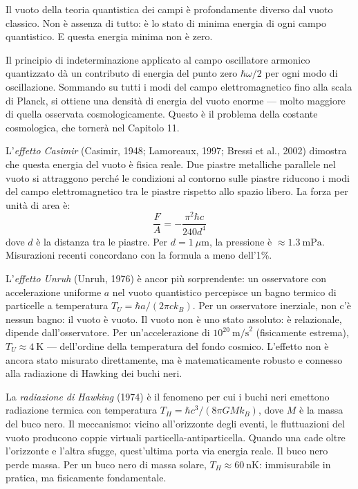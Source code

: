 \documentclass[11.5pt,a4paper,openany]{book}
\theoremstyle{remark}
\begin{document}
Il vuoto della teoria quantistica dei campi è profondamente diverso dal vuoto classico. Non è assenza di tutto: è lo stato di minima energia di ogni campo quantistico. E questa energia minima non è zero.

Il principio di indeterminazione applicato al campo oscillatore armonico quantizzato dà un contributo di energia del punto zero $\hbar\omega/2$ per ogni modo di oscillazione. Sommando su tutti i modi del campo elettromagnetico fino alla scala di Planck, si ottiene una densità di energia del vuoto enorme --- molto maggiore di quella osservata cosmologicamente. Questo è il problema della costante cosmologica, che tornerà nel Capitolo 11.

L'\textit{effetto Casimir} (Casimir, 1948; Lamoreaux, 1997; Bressi et al., 2002) dimostra che questa energia del vuoto è fisica reale. Due piastre metalliche parallele nel vuoto si attraggono perché le condizioni al contorno sulle piastre riducono i modi del campo elettromagnetico tra le piastre rispetto allo spazio libero. La forza per unità di area è:
\[
\frac{F}{A} = -\frac{\pi^2 \hbar c}{240 d^4}
\]
dove $d$ è la distanza tra le piastre. Per $d = 1\ \mu\text{m}$, la pressione è $\approx 1.3\ \text{mPa}$. Misurazioni recenti concordano con la formula a meno dell'1\%.

L'\textit{effetto Unruh} (Unruh, 1976) è ancor più sorprendente: un osservatore con accelerazione uniforme $a$ nel vuoto quantistico percepisce un bagno termico di particelle a temperatura $T_U = \hbar a/(2\pi c k_B)$. Per un osservatore inerziale, non c'è nessun bagno: il vuoto è vuoto. Il vuoto non è uno stato assoluto: è relazionale, dipende dall'osservatore. Per un'accelerazione di $10^{20}\ \text{m/s}^2$ (fisicamente estrema), $T_U \approx 4\ \text{K}$ --- dell'ordine della temperatura del fondo cosmico. L'effetto non è ancora stato misurato direttamente, ma è matematicamente robusto e connesso alla radiazione di Hawking dei buchi neri.

La \textit{radiazione di Hawking} (1974) è il fenomeno per cui i buchi neri emettono radiazione termica con temperatura $T_H = \hbar c^3/(8\pi GM k_B)$, dove $M$ è la massa del buco nero. Il meccanismo: vicino all'orizzonte degli eventi, le fluttuazioni del vuoto producono coppie virtuali particella-antiparticella. Quando una cade oltre l'orizzonte e l'altra sfugge, quest'ultima porta via energia reale. Il buco nero perde massa. Per un buco nero di massa solare, $T_H \approx 60\ \text{nK}$: immisurabile in pratica, ma fisicamente fondamentale.
\end{document}
